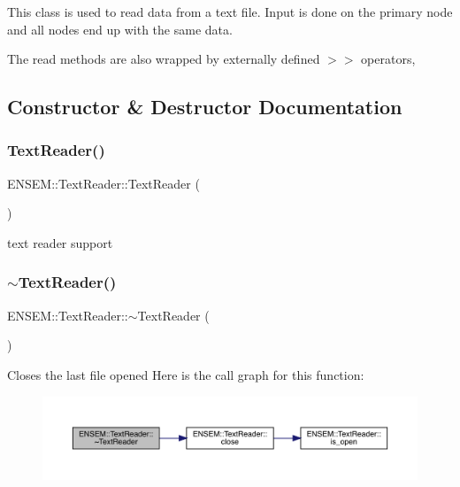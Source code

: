 This class is used to read data from a text file. Input is done on the primary node and all nodes end up with the same data.

The read methods are also wrapped by externally defined $>$$>$ operators, 

\subsection{Constructor \& Destructor Documentation}
\mbox{\label{classENSEM_1_1TextReader_a139e8717032f310089148dd58b30d1d2}} 
\subsubsection{\texorpdfstring{TextReader()}{TextReader()}\hspace{0.1cm}{\footnotesize\ttfamily [1/4]}}
{\footnotesize\ttfamily E\+N\+S\+E\+M\+::\+Text\+Reader\+::\+Text\+Reader (\begin{DoxyParamCaption}{ }\end{DoxyParamCaption})}



text reader support 

\mbox{\label{classENSEM_1_1TextReader_a95ed1b116302f6fc2532451bd5df2dbd}} 
\subsubsection{\texorpdfstring{$\sim$TextReader()}{~TextReader()}\hspace{0.1cm}{\footnotesize\ttfamily [1/2]}}
{\footnotesize\ttfamily E\+N\+S\+E\+M\+::\+Text\+Reader\+::$\sim$\+Text\+Reader (\begin{DoxyParamCaption}{ }\end{DoxyParamCaption})}

Closes the last file opened Here is the call graph for this function\+:\nopagebreak
\begin{figure}[H]
\begin{center}
\leavevmode
\includegraphics[width=350pt]{d4/d23/classENSEM_1_1TextReader_a95ed1b116302f6fc2532451bd5df2dbd_cgraph}
\end{center}
\end{figure}
\mbox{\label{classENSEM_1_1TextReader_a1c253bcaf58b6f01f25bb10b798f771e}} 
